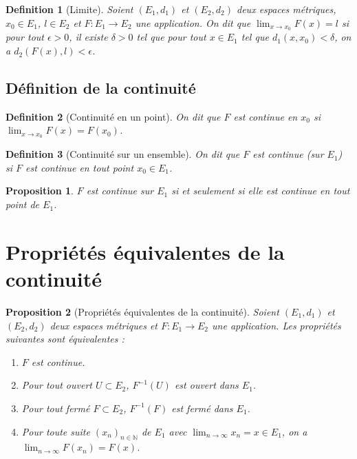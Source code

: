 \documentclass{article}
\newtheorem{proposition}{Proposition}
\newtheorem{definition}{Definition}
\begin{document}
\begin{definition}[Limite]
Soient $(E_1, d_1)$ et $(E_2, d_2)$ deux espaces métriques, $x_0 \in E_1$, $l \in E_2$ et $F : E_1 \to E_2$ une application. On dit que $\lim_{x \to x_0} F(x) = l$ si pour tout $\epsilon > 0$, il existe $\delta > 0$ tel que pour tout $x \in E_1$ tel que $d_1(x, x_0) < \delta$, on a $d_2(F(x), l) < \epsilon$.
\end{definition}

\subsection{Définition de la continuité}

\begin{definition}[Continuité en un point]
On dit que $F$ est continue en $x_0$ si $\lim_{x \to x_0} F(x) = F(x_0)$.
\end{definition}

\begin{definition}[Continuité sur un ensemble]
On dit que $F$ est continue (sur $E_1$) si $F$ est continue en tout point $x_0 \in E_1$.
\end{definition}

\begin{proposition}
$F$ est continue sur $E_1$ si et seulement si elle est continue en tout point de $E_1$.
\end{proposition}

\section{Propriétés équivalentes de la continuité}

\begin{proposition}[Propriétés équivalentes de la continuité]
Soient $(E_1, d_1)$ et $(E_2, d_2)$ deux espaces métriques et $F : E_1 \to E_2$ une application. Les propriétés suivantes sont équivalentes :
\begin{enumerate}
    \item $F$ est continue.
    \item Pour tout ouvert $U \subset E_2$, $F^{-1}(U)$ est ouvert dans $E_1$.
    \item Pour tout fermé $F \subset E_2$, $F^{-1}(F)$ est fermé dans $E_1$.
    \item Pour toute suite $(x_n)_{n \in \mathbb{N}}$ de $E_1$ avec $\lim_{n \to \infty} x_n = x \in E_1$, on a $\lim_{n \to \infty} F(x_n) = F(x)$.
\end{enumerate}
\end{proposition}
\end{document}
